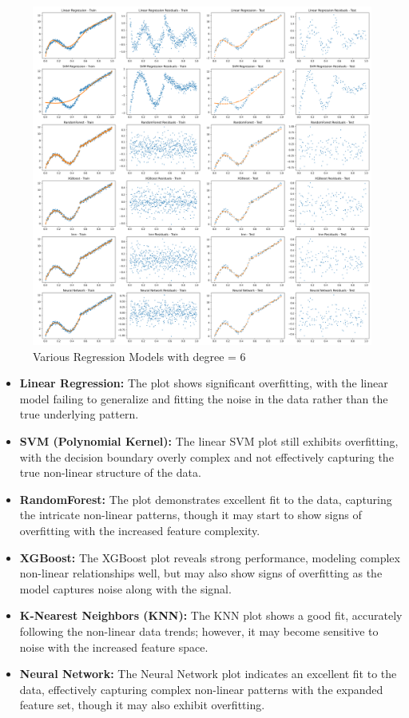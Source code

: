\begin{figure}[H]
	\centering
	\includegraphics[width=0.8\linewidth]{./Images/E3-MLR3-6.png}
	\caption{Various Regression Models with degree = 6}
\end{figure}

\begin{itemize}
    \item \textbf{Linear Regression:} The plot shows significant overfitting, with the linear model failing to generalize and fitting the noise in the data rather than the true underlying pattern.
    \item \textbf{SVM (Polynomial Kernel):} The linear SVM plot still exhibits overfitting, with the decision boundary overly complex and not effectively capturing the true non-linear structure of the data.
    \item \textbf{RandomForest:} The plot demonstrates excellent fit to the data, capturing the intricate non-linear patterns, though it may start to show signs of overfitting with the increased feature complexity.
    \item \textbf{XGBoost:} The XGBoost plot reveals strong performance, modeling complex non-linear relationships well, but may also show signs of overfitting as the model captures noise along with the signal.
    \item \textbf{K-Nearest Neighbors (KNN):} The KNN plot shows a good fit, accurately following the non-linear data trends; however, it may become sensitive to noise with the increased feature space.
    \item \textbf{Neural Network:} The Neural Network plot indicates an excellent fit to the data, effectively capturing complex non-linear patterns with the expanded feature set, though it may also exhibit overfitting.
\end{itemize}

